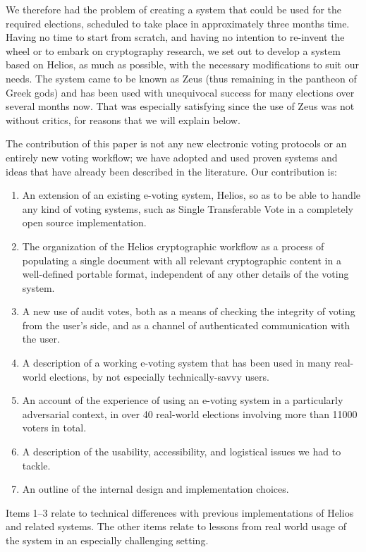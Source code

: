 \documentclass[letterpaper,10pt]{article}
\begin{document}
We therefore had the problem of creating a system that could be used
for the required elections, scheduled to take place in approximately
three months time. Having no time to start from scratch, and having
no intention to re-invent the wheel or to embark on cryptography
research, we set out to develop a system based on Helios, as much as
possible, with the necessary modifications to suit our needs. The
system came to be known as Zeus (thus remaining in the pantheon of
Greek gods) and has been used with unequivocal success for many
elections over several months now. That was especially satisfying
since the use of Zeus was not without critics, for reasons that we
will explain below.

The contribution of this paper is not any new electronic voting
protocols or an entirely new voting workflow; we have adopted and used
proven systems and ideas that have already been described in the
literature. Our contribution is:
\begin{enumerate}
\item An extension of an existing e-voting system, Helios, so as to be
  able to handle any kind of voting systems, such as Single
  Transferable Vote in a completely open source implementation.
\item The organization of the Helios cryptographic workflow as a
  process of populating a single document with all relevant
  cryptographic content in a well-defined portable format,
  independent of any other details of the voting system.
\item A new use of audit votes, both as a means of checking the
  integrity of voting from the user's side, and as a channel of
  authenticated communication with the user.
\item A description of a working e-voting system that has been used in
  many real-world elections, by not especially technically-savvy
  users.
\item An account of the experience of using an e-voting system in a
  particularly adversarial context, in over 40 real-world elections
  involving more than 11000 voters in total.
\item A description of the usability, accessibility, and logistical
  issues we had to tackle.
\item An outline of the internal design and implementation choices.
\end{enumerate}

Items 1--3 relate to technical differences with previous
implementations of Helios and related systems. The other items relate
to lessons from real world usage of the system in an especially
challenging setting.
\end{document}
